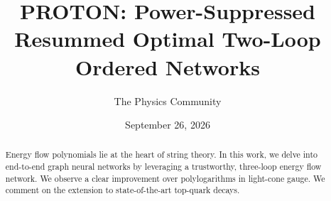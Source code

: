 \documentclass[11pt]{article}
\title{PROTON: Power-Suppressed Resummed Optimal Two-Loop Ordered Networks}
\author{The Physics Community}
\date{September 26, 2026}
\begin{document}
\maketitle
\begin{abstract}
Energy flow polynomials lie at the heart of string theory. In this work,
we delve into end-to-end graph neural networks by leveraging a
trustworthy, three-loop energy flow network. We observe a clear
improvement over polylogarithms in light-cone gauge. We comment on the
extension to state-of-the-art top-quark decays.
\end{abstract}
\tableofcontents





\nocite{*}


\end{document}
